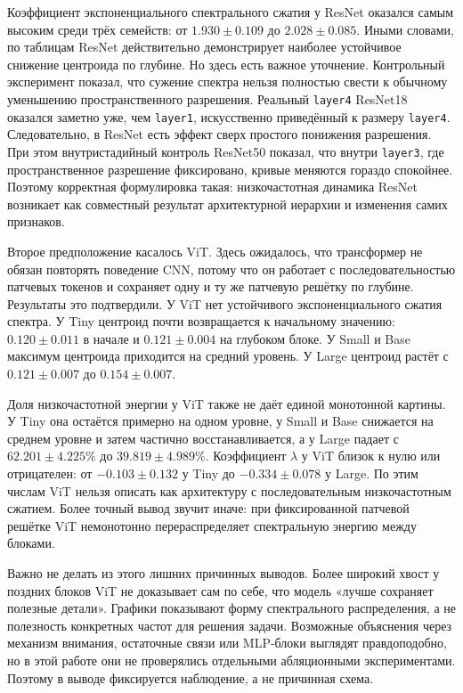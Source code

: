 Коэффициент экспоненциального спектрального сжатия у ResNet оказался самым высоким среди трёх семейств: от $1.930 \pm 0.109$ до $2.028 \pm 0.085$. Иными словами, по таблицам ResNet действительно демонстрирует наиболее устойчивое снижение центроида по глубине. Но здесь есть важное уточнение. Контрольный эксперимент показал, что сужение спектра нельзя полностью свести к обычному уменьшению пространственного разрешения. Реальный \texttt{layer4} ResNet18 оказался заметно уже, чем \texttt{layer1}, искусственно приведённый к размеру \texttt{layer4}. Следовательно, в ResNet есть эффект сверх простого понижения разрешения. При этом внутристадийный контроль ResNet50 показал, что внутри \texttt{layer3}, где пространственное разрешение фиксировано, кривые меняются гораздо спокойнее. Поэтому корректная формулировка такая: низкочастотная динамика ResNet возникает как совместный результат архитектурной иерархии и изменения самих признаков.

Второе предположение касалось ViT. Здесь ожидалось, что трансформер не обязан повторять поведение CNN, потому что он работает с последовательностью патчевых токенов и сохраняет одну и ту же патчевую решётку по глубине. Результаты это подтвердили. У ViT нет устойчивого экспоненциального сжатия спектра. У Tiny центроид почти возвращается к начальному значению: $0.120\pm0.011$ в начале и $0.121\pm0.004$ на глубоком блоке. У Small и Base максимум центроида приходится на средний уровень. У Large центроид растёт с $0.121\pm0.007$ до $0.154\pm0.007$.

Доля низкочастотной энергии у ViT также не даёт единой монотонной картины. У Tiny она остаётся примерно на одном уровне, у Small и Base снижается на среднем уровне и затем частично восстанавливается, а у Large падает с $62.201\pm4.225\%$ до $39.819\pm4.989\%$. Коэффициент $\lambda$ у ViT близок к нулю или отрицателен: от $-0.103 \pm 0.132$ у Tiny до $-0.334 \pm 0.078$ у Large. По этим числам ViT нельзя описать как архитектуру с последовательным низкочастотным сжатием. Более точный вывод звучит иначе: при фиксированной патчевой решётке ViT немонотонно перераспределяет спектральную энергию между блоками.

Важно не делать из этого лишних причинных выводов. Более широкий хвост у поздних блоков ViT не доказывает сам по себе, что модель «лучше сохраняет полезные детали». Графики показывают форму спектрального распределения, а не полезность конкретных частот для решения задачи. Возможные объяснения через механизм внимания, остаточные связи или MLP-блоки выглядят правдоподобно, но в этой работе они не проверялись отдельными абляционными экспериментами. Поэтому в выводе фиксируется наблюдение, а не причинная схема.

